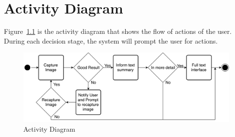\chapter{Activity Diagram}
Figure~\ref{activityDiagram} is the activity diagram that shows the flow of actions of the user.
During each decision stage, the system will prompt the user for actions.


\begin{figure}
	\centering
    \includegraphics[scale = 0.105]{Activity_H.png}%
    
    \caption{Activity Diagram}
	\label{activityDiagram}
\end{figure}